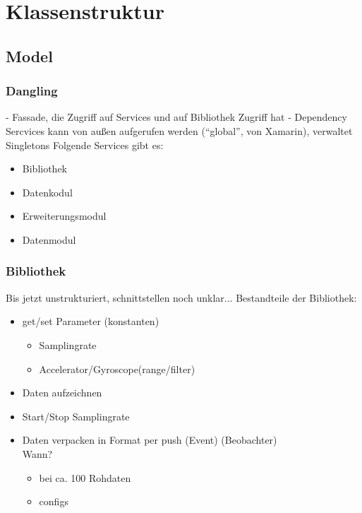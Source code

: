 \documentclass[a4paper,12pt]{article}
\author {ab Protokoll 12.3.19}
\begin{document}
\section{Klassenstruktur}

\subsection{Model}
\subsubsection{Dangling}
- Fassade, die Zugriff auf Services und auf Bibliothek Zugriff hat
- Dependency Sercvices kann von außen aufgerufen werden (``global'', von Xamarin), verwaltet Singletons
Folgende Services gibt es:
\begin{itemize}
    \item Bibliothek
    \item Datenkodul
    \item Erweiterungsmodul
    \item Datenmodul
\end{itemize}
\subsubsection{Bibliothek} 
Bis jetzt unstrukturiert, schnittstellen noch unklar...
Bestandteile der Bibliothek:
\begin{itemize}
    \item {
        get/set Parameter (konstanten)
        \begin{itemize}
            \item Samplingrate
            \item Accelerator/Gyroscope(range/filter)
        \end{itemize}
        }
    \item Daten aufzeichnen %
    \item Start/Stop Samplingrate
    \item {
        Daten verpacken in Format per push (Event) (Beobachter)\\
        Wann? %
        \begin{itemize}
            \item bei ca. 100 Rohdaten
            \item configs %
        \end{itemize}
        } 
\end{itemize}
\end{document}
